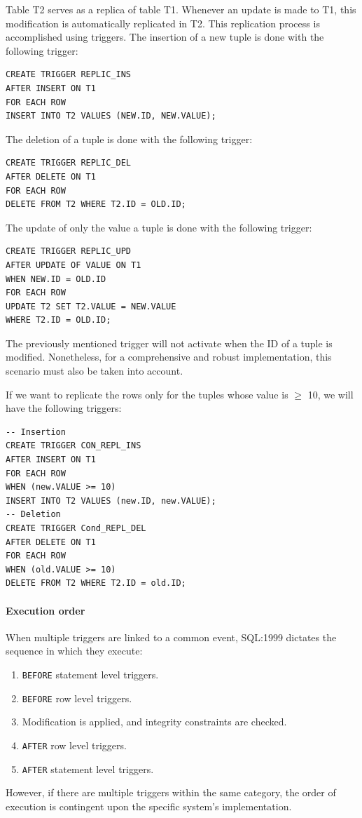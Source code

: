 \begin{example}
    Table T2 serves as a replica of table T1. 
    Whenever an update is made to T1, this modification is automatically replicated in T2. 
    This replication process is accomplished using triggers.
    The insertion of a new tuple is done with the following trigger: 
    \begin{lstlisting}[style=SQL]
CREATE TRIGGER REPLIC_INS
AFTER INSERT ON T1
FOR EACH ROW
INSERT INTO T2 VALUES (NEW.ID, NEW.VALUE);
    \end{lstlisting}
    The deletion of a tuple is done with the following trigger: 
    \begin{lstlisting}[style=SQL]
CREATE TRIGGER REPLIC_DEL
AFTER DELETE ON T1
FOR EACH ROW
DELETE FROM T2 WHERE T2.ID = OLD.ID;
    \end{lstlisting}
    The update of only the value a tuple is done with the following trigger: 
    \begin{lstlisting}[style=SQL]
CREATE TRIGGER REPLIC_UPD
AFTER UPDATE OF VALUE ON T1
WHEN NEW.ID = OLD.ID
FOR EACH ROW
UPDATE T2 SET T2.VALUE = NEW.VALUE
WHERE T2.ID = OLD.ID;
    \end{lstlisting}
    The previously mentioned trigger will not activate when the ID of a tuple is modified. 
    Nonetheless, for a comprehensive and robust implementation, this scenario must also be taken into account.

    If we want to replicate the rows only for the tuples whose value is $\geq$ 10, we will have the following triggers: 
    \begin{lstlisting}[style=SQL]
-- Insertion
CREATE TRIGGER CON_REPL_INS
AFTER INSERT ON T1
FOR EACH ROW
WHEN (new.VALUE >= 10)
INSERT INTO T2 VALUES (new.ID, new.VALUE);
-- Deletion
CREATE TRIGGER Cond_REPL_DEL
AFTER DELETE ON T1
FOR EACH ROW
WHEN (old.VALUE >= 10)
DELETE FROM T2 WHERE T2.ID = old.ID;
    \end{lstlisting}
\end{example}

\paragraph*{Execution order}
When multiple triggers are linked to a common event, SQL:1999 dictates the sequence in which they execute: 
\begin{enumerate}
    \item \texttt{BEFORE} statement level triggers. 
    \item \texttt{BEFORE} row level triggers. 
    \item Modification is applied, and integrity constraints are checked.
    \item \texttt{AFTER} row level triggers. 
    \item \texttt{AFTER} statement level triggers.
\end{enumerate}
However, if there are multiple triggers within the same category, the order of execution is contingent upon the specific system's implementation.

